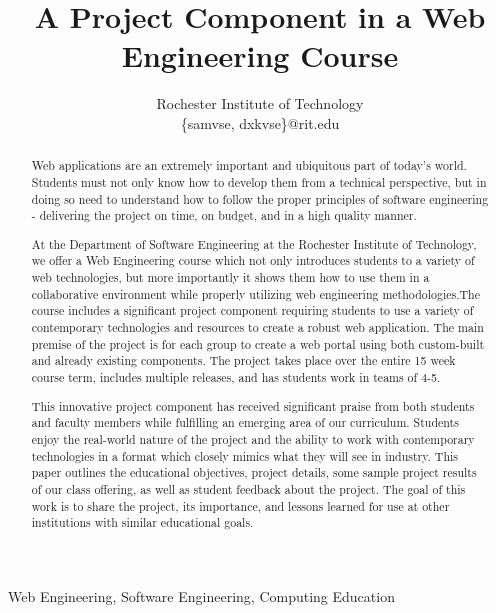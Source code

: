 \documentclass[conference]{IEEEtran}
\begin{document}
\title{A Project Component in a Web Engineering Course}

\author{
Rochester Institute of Technology\\
\{samvse, dxkvse\}@rit.edu

}
\maketitle
\begin{abstract}
Web applications are an extremely important and ubiquitous part of today's world. Students must not only know how to develop them from a technical perspective, but in doing so need to understand how to follow the proper principles of software engineering - delivering the project on time, on budget, and in a high quality manner.

At the Department of Software Engineering at the Rochester Institute of Technology, we offer a Web Engineering course which not only introduces students to a variety of web technologies, but more importantly it shows them how to use them in a collaborative environment while properly utilizing web engineering methodologies.The course includes a significant project component requiring students to use a variety of contemporary technologies and resources to create a robust web application. The main premise of the project is for each group to create a web portal using both custom-built and already existing components. The project takes place over the entire 15 week course term, includes multiple releases, and has students work in teams of 4-5.

This innovative project component has received significant praise from both students and faculty members while fulfilling an emerging area of our curriculum. Students enjoy the real-world nature of the project and the ability to work with contemporary technologies in a format which closely mimics what they will see in industry. This paper outlines the educational objectives, project details, some sample project results of our class offering, as well as student feedback about the project. The goal of this work is to share the project, its importance, and lessons learned for use at other institutions with similar educational goals.

\end{abstract}


\begin{IEEEkeywords} Web Engineering, Software Engineering, Computing Education\end{IEEEkeywords}
\end{document}
